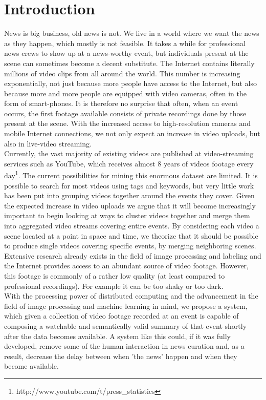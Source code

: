 %
\section{Introduction}
%
News is big business, old news is not. We live in a world where we want the news as they happen, which mostly is not feasible. It takes a while for professional news crews to show up at a news-worthy event, but individuals present at the scene can sometimes become a decent substitute. The Internet contains literally millions of video clips from all around the world. This number is increasing exponentially, not just because more people have access to the Internet, but also because more and more people are equipped with video cameras, often in the form of smart-phones. It is therefore no surprise that often, when an event occurs, the first footage available consists of private recordings done by those present at the scene. With the increased access to high-resolution cameras and mobile Internet connections, we not only expect an increase in video uploads, but also in live-video streaming.\\
Currently, the vast majority of existing videos are published at video-streaming services such as YouTube, which receives almost 8 years of videos footage every day\footnote{http://www.youtube.com/t/press\_statistics}. The current possibilities for mining this enormous dataset are limited. It is possible to search for most videos using tags and keywords, but very little work has been put into grouping videos together around the events they cover. Given the expected increase in video uploads we argue that it will become increasingly important to begin looking at ways to cluster videos together and merge them into aggregated video streams covering entire events. By considering each video a scene located at a point in space and time, we theorize that it should be possible to produce single videos covering specific events, by merging neighboring scenes.\\
Extensive research already exists in the field of image processing and labeling and the Internet provides access to an abundant source of video footage. However, this footage is commonly of a rather low quality (at least compared to professional recordings). For example it can be too shaky or too dark.\\
With the processing power of distributed computing and the advancement in the field of image processing and machine learning in mind, we propose a system, which given a collection of video footage recorded at an event is capable of composing a watchable and semantically valid summary of that event shortly after the data becomes available. A system like this could, if it was fully developed, remove some of the human interaction in news curation and, as a result, decrease the delay between when 'the news' happen and when they become available.
%
